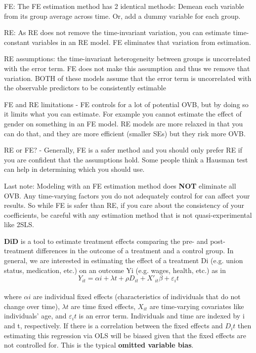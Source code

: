\documentclass[7pt, a4paper]{article}
\begin{document}
\begin{multicols*}{3}
FE: The FE estimation method has 2 identical methods: Demean each variable from its group average across time. Or, add a dummy variable for each group.

RE: As RE does not remove the time-invariant variation, you can estimate time-constant variables in an RE model. FE eliminates that variation from estimation.

RE assumptions: the time-invariant heterogeneity between groups is uncorrelated with the error term. FE does not make this assumption and thus we remove that variation. BOTH of these models assume that the error term is uncorrelated with the observable predictors to be consistently estimable

FE and RE limitations - FE controls for a lot of potential OVB, but by doing so it limits what you can estimate. For example you cannot estimate the effect of gender on something in an FE model. RE models are more relaxed in that you can do that, and they are more efficient (smaller SEs) but they risk more OVB.

RE or FE? - Generally, FE is a safer method and you should only prefer RE if you are confident that the assumptions hold. Some people think a Hausman test can help in determining which you should use.

Last note: Modeling with an FE estimation method does \textbf{NOT} eliminate all OVB. Any time-varying factors you do not adequately control for can affect your results. So while FE is safer than RE, if you care about the consistency of your coefficients, be careful with any estimation method that is not quasi-experimental like 2SLS.  

\textbf{DiD} is a tool to estimate treatment effects comparing the pre- and post-treatment differences in the outcome of a treatment and a control group. In general, we are interested in estimating the effect of a treatment Di (e.g. union status, medication, etc.) on an outcome Yi (e.g. wages, health, etc.) as in\\
$$Y_{it}=\alpha i + \lambda t + \rho D_{it} + X'_{it}\beta + \varepsilon_it$$\\
where $\alpha i$ are individual fixed effects (characteristics of individuals that do not change over time), $\lambda t$ are time fixed effects, $X_{it}$ are time-varying covariates like individuals' age, and $\varepsilon_it$ is an error term. Individuals and time are indexed by i and t, respectively. If there is a correlation between the fixed effects and $D_it$ then estimating this regression via OLS will be biased given that the fixed effects are not controlled for. This is the typical \textbf{omitted variable bias}.


\end{multicols*}
\end{document}
